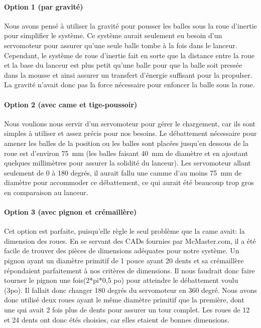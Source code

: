 \paragraph{Option 1 (par gravité)}
Nous avons pensé à utiliser la gravité pour pousser les balles sous la roue d’inertie pour simplifier le système.
Ce système aurait seulement eu besoin d’un servomoteur pour assurer qu’une seule balle tombe à la fois dans le lanceur.
Cependant, le système de roue d’inertie fait en sorte que la distance entre la roue et la base du lanceur est plus petit qu’une balle pour que la balle soit pressée dans la mousse et ainsi assurer un transfert d’énergie suffisant pour la propulser.
La gravité n’avait donc pas la force nécessaire pour enfoncer la balle sous la roue.

\paragraph{Option 2 (avec came et tige-poussoir)}
Nous voulions nous servir d’un servomoteur pour gérer le chargement, car ils sont simples à utiliser et assez précis pour nos besoins.
Le débattement nécessaire pour amener les balles de la position ou les balles sont placées jusqu’en dessous de la roue est d’environ 75~mm (les balles faisant 40~mm de diamètre et en ajoutant quelques millimètres pour assurer la solidité du lanceur).
Les servomoteur allant seulement de 0 à 180 degrés, il aurait fallu une camme d’au moins 75~mm de diamètre pour accommoder ce débattement, ce qui aurait été beaucoup trop gros en comparaison au lanceur.

\paragraph{Option 3 (avec pignon et crémaillère)}
Cet option est parfaite, puisqu’elle règle le seul problème que la came avait: la dimension des roues.
En se servant des CADs fournies par McMaster.com, il a été facile de trouver des pièces de dimensions adéquates pour notre système.
Un pignon ayant un diamètre primitif de 1 pouce ayant 20 dents et sa crémaillère répondaient parfaitement à nos critères de dimensions.
Il nous faudrait donc faire tourner le pignon une fois(2*pi*0,5 po) pour atteindre le débattement voulu (3po).
Il fallait donc changer 180 degrés du servomoteur en 360 degré.
Nous avons donc utilisé deux roues ayant le même diamètre primitif que la première, dont une qui avait 2 fois plus de dents pour assurer un tour complet.
Les roues de 12 et 24 dents ont donc étés choisies, car elles etaient de bonnes dimensions.

